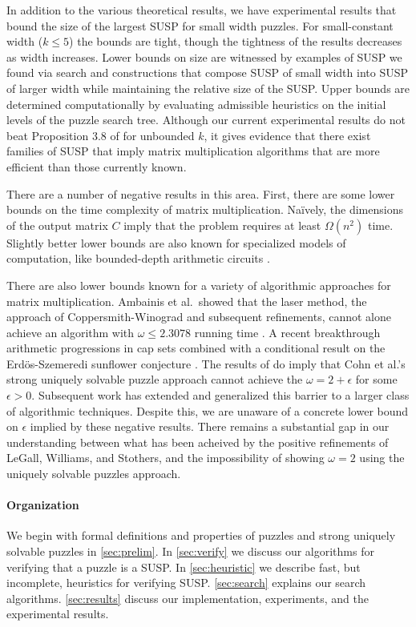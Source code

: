 \documentclass[11pt]{article}
\begin{document}

In addition to the various theoretical results, we have experimental
results that bound the size of the largest SUSP for small width
puzzles.  For small-constant width ($k \le 5$) the bounds are tight,
though the tightness of the results decreases as width increases.
Lower bounds on size are witnessed by examples of SUSP we found via
search and constructions that compose SUSP of small width into SUSP of
larger width while maintaining the relative size of the SUSP.  Upper
bounds are determined computationally by evaluating admissible
heuristics on the initial levels of the puzzle search tree.  Although
our current experimental results do not beat Proposition 3.8 of
\cite{cksu05} for unbounded $k$, it gives evidence that there exist
families of SUSP that imply matrix multiplication algorithms that are
more efficient than those currently known.

There are a number of negative results in this area.  First, there are
some lower bounds on the time complexity of matrix multiplication.
Na\"{i}vely, the dimensions of the output matrix $C$ imply that the
problem requires at least $\Omega(n^2)$ time.  Slightly better lower
bounds are also known for specialized models of computation, like
bounded-depth arithmetic circuits \cite{XXX}.

There are also lower bounds known for a variety of algorithmic
approaches for matrix multiplication.  Ambainis et al.~showed that the
laser method, the approach of Coppersmith-Winograd and subsequent
refinements, cannot alone achieve an algorithm with $\omega \le
2.3078$ running time \cite{afl14}.  A recent breakthrough arithmetic
progressions in cap sets \cite{e16,clp16} combined with a conditional
result on the Erd\"{o}s-Szemeredi sunflower conjecture \cite{asu13}.
The results of \cite{bccgu16} do imply that Cohn et al.'s strong
uniquely solvable puzzle approach cannot achieve the $\omega = 2 +
\epsilon$ for some $\epsilon > 0$.  Subsequent work has extended and
generalized this barrier \cite{avw18a,avw18b} to a larger
class of algorithmic techniques.  Despite this, we are unaware of a
concrete lower bound on $\epsilon$ implied by these negative results.
There remains a substantial gap in our understanding
between what has been acheived by the positive refinements of LeGall, Williams,
and Stothers, and the impossibility of showing $\omega = 2$ using the
uniquely solvable puzzles approach.

\paragraph{Organization}
We begin with formal definitions and properties of puzzles and strong
uniquely solvable puzzles in \autoref{sec:prelim}.  In
\autoref{sec:verify} we discuss our algorithms for verifying that a
puzzle is a SUSP.  In \autoref{sec:heuristic} we describe fast,
but incomplete, heuristics for verifying SUSP.
\autoref{sec:search} explains our search algorithms.
\autoref{sec:results} discuss our implementation, experiments, and
the experimental results.
\end{document}
